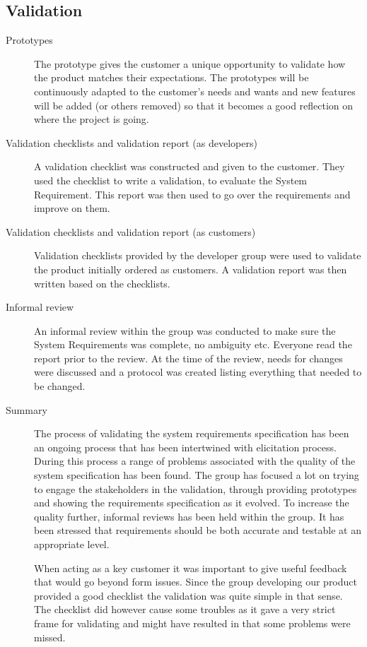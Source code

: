 \documentclass[10pt,a4paper]{article}
\begin{document}
\subsection{Validation}
\begin{description}
\item[Prototypes] The prototype gives the customer a unique opportunity to validate how the product matches their expectations. The prototypes will be continuously adapted to the customer's needs and wants and new features will be added (or others removed) so that it becomes a good reflection on where the project is going. 

\item[Validation checklists and validation report (as developers)] A validation checklist was constructed and given to the customer. They used the checklist to write a validation, to evaluate the System Requirement. This report was then used to go over the requirements and improve on them.

\item[Validation checklists and validation report (as customers)] Validation checklists provided by the developer group were used to validate the product initially ordered as customers. A validation report was then written based on the checklists.

\item[Informal review] An informal review within the group was conducted to make sure the System Requirements was complete, no ambiguity etc. Everyone read the report prior to the review. At the time of the review, needs for changes were discussed and a protocol was created listing everything that needed to be changed.

\item[Summary] The process of validating the system requirements specification has been an ongoing process that has been intertwined with elicitation process. During this process a range of problems associated with the quality of the system specification has been found. The group has focused a lot on trying to engage the stakeholders in the validation, through providing prototypes and showing the requirements specification as it evolved. To increase the quality further, informal reviews has been held within the group. It has been stressed that requirements should be both accurate and testable at an appropriate level.

When acting as a key customer it was important to give useful feedback that would go beyond form issues. Since the group developing our product provided a good checklist the validation was quite simple in that sense. The checklist did however cause some troubles as it gave a very strict frame for validating and might have resulted in that some problems were missed. 
\end{description}
\end{document}
